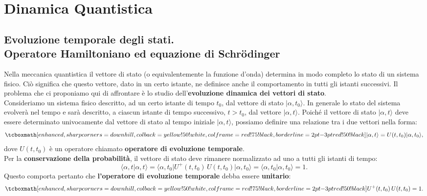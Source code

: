 \chapter{Dinamica Quantistica}
\section[Evoluzione temporale degli stati]{Evoluzione temporale degli stati.\\Operatore Hamiltoniano ed equazione di Schr\"{o}dinger}
Nella meccanica quantistica il vettore di stato (o equivalentemente la funzione d'onda) determina in modo completo lo stato di un sistema fisico. Ciò significa che questo vettore, dato in un certo istante, ne definisce anche il comportamento in tutti gli istanti successivi. Il problema che ci proponiamo qui di affrontare è lo studio dell'\textbf{evoluzione dinamica dei vettori di stato}.\\

Consideriamo un sistema fisico descritto, ad un certo istante di tempo $t_0$, dal vettore di stato $\vert \alpha, t_0 \rangle$. In generale lo stato del sistema evolverà nel tempo e sarà descritto, a ciascun istante di tempo successivo, $t>t_0$, dal vettore $\vert \alpha, t\rangle$. Poiché il vettore di stato $\vert \alpha, t \rangle$ deve essere determinato univocamente dal vettore di stato al tempo iniziale $\vert \alpha, t \rangle$, possiamo definire una relazione tra i due vettori nella forma:
	\begin{equation}
		\tcboxmath[enhanced, sharp corners=downhill, colback=yellow!50!white, colframe=red!75!black, borderline={2pt}{-3pt}{red!50!black}]{	
			\vert \alpha, t \rangle = U(t,t_0)\vert \alpha, t_0 \rangle,
			}
	\end{equation}
dove $U(t,t_0)$ è un operatore chiamato \textbf{operatore di evoluzione temporale}.\\

Per la \textbf{conservazione della probabilità}, il vettore di stato deve rimanere normalizzato ad uno a tutti gli istanti di tempo:
	\begin{equation}
		\langle \alpha, t \vert \alpha, t \rangle =
\langle \alpha, t_0 \vert U^+ (t,t_0)\, U(t,t_0)\vert \alpha, t_0 \rangle =  \langle \alpha, t_0 \vert \alpha, t_0 \rangle =1.
	\end{equation}
Questo comporta pertanto che  \textbf{l'operatore di evoluzione temporale} debba essere \textbf{unitario}:
	\begin{equation}
		\tcboxmath[enhanced, sharp corners=downhill, colback=yellow!50!white, colframe=red!75!black, borderline={2pt}{-3pt}{red!50!black}]{
			U^+ (t,t_0)\, U(t,t_0)=1.
			}
	\end{equation}\\
	
